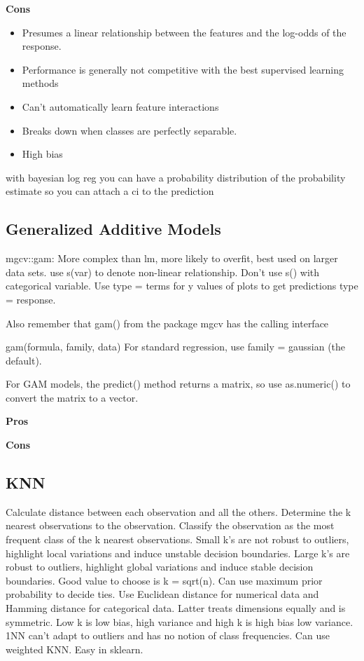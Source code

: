 \documentclass[]{book}
\begin{document}
\textbf{Cons}

\begin{itemize}
\item
  Presumes a linear relationship between the features and the log-odds of the response.
\item
  Performance is generally not competitive with the best supervised learning methods
\item
  Can't automatically learn feature interactions
\item
  Breaks down when classes are perfectly separable.
\item
  High bias
\end{itemize}

with bayesian log reg you can have a probability distribution of the probability estimate so you can attach a ci to the prediction

\hypertarget{generalized-additive-models}{%
\subsection{Generalized Additive Models}\label{generalized-additive-models}}

mgcv::gam: More complex than lm, more likely to overfit, best used on larger data sets. use s(var) to denote non-linear relationship. Don't use s() with categorical variable. Use type = terms for y values of plots to get predictions type = response.

Also remember that gam() from the package mgcv has the calling interface

gam(formula, family, data)
For standard regression, use family = gaussian (the default).

For GAM models, the predict() method returns a matrix, so use as.numeric() to convert the matrix to a vector.

\textbf{Pros}

\textbf{Cons}

\hypertarget{knn}{%
\subsection{KNN}\label{knn}}

Calculate distance between each observation and all the others. Determine the k nearest observations to the observation. Classify the observation as the most frequent class of the k nearest observations. Small k's are not robust to outliers, highlight local variations and induce unstable decision boundaries. Large k's are robust to outliers, highlight global variations and induce stable decision boundaries. Good value to choose is k = sqrt(n). Can use maximum prior probability to decide ties. Use Euclidean distance for numerical data and Hamming distance for categorical data. Latter treats dimensions equally and is symmetric. Low k is low bias, high variance and high k is high bias low variance. 1NN can't adapt to outliers and has no notion of class frequencies. Can use weighted KNN. Easy in sklearn.
\end{document}
